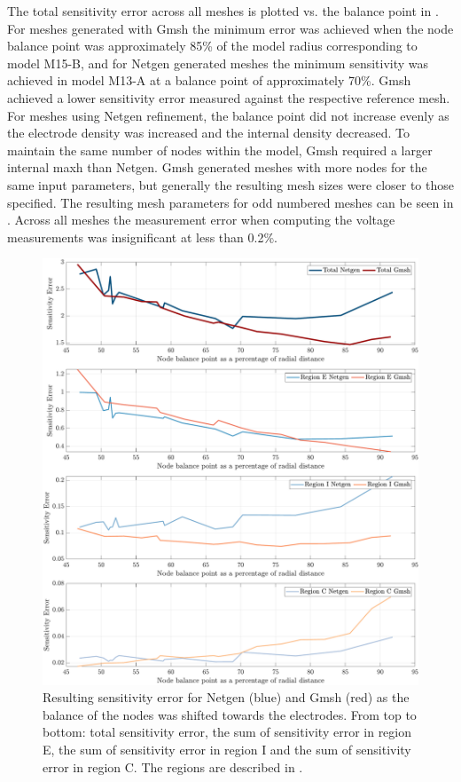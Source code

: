 The total sensitivity error across all meshes is plotted vs. the balance point in
. For meshes generated with Gmsh the minimum error was 
achieved when the node balance point was approximately 85\% of the model radius corresponding
to model M15-B, 
and for Netgen generated meshes the minimum sensitivity was achieved in model M13-A at a balance point
of approximately 70\%. Gmsh achieved a lower sensitivity error measured against
the respective reference mesh. For meshes using Netgen refinement, the balance point did not
increase evenly as the electrode density was increased and the internal density decreased. 
To maintain the same number of nodes within the model, Gmsh required a larger internal maxh
than Netgen. Gmsh generated meshes with more nodes for the same input
parameters, but  generally the resulting mesh sizes were closer to those specified. The
resulting mesh parameters for odd numbered meshes can be seen in .
Across all meshes the measurement error when computing the voltage measurements was insignificant
at less than 0.2\%.

\begin{figure}
  \includegraphics[width=\columnwidth]{chapter4-mesh_refinement/imgs/m-mesh_sens_error_regions_split.pdf}
  \caption[Sensitivity error with shifting node balance]{\label{fig:balance_sens}
  Resulting sensitivity error for Netgen (blue) and Gmsh (red) as the balance of the nodes
  was shifted towards the electrodes. From top to bottom: total sensitivity error, the sum of 
  sensitivity error in region E, the sum of sensitivity error in region I and the sum of
  sensitivity error in region C. The regions are described in .}
\end{figure}

